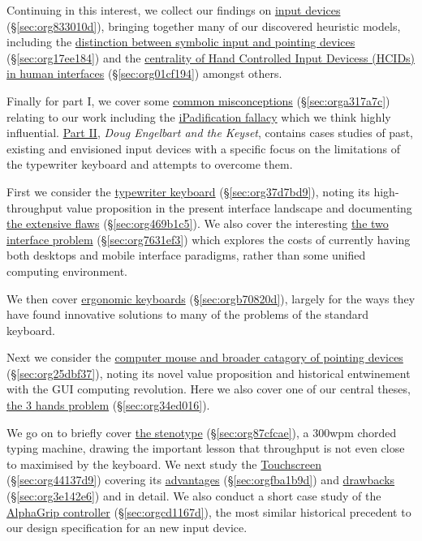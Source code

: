 \documentclass[logo,bsc,singlespacing,parskip]{infthesis}
\begin{document}
Continuing in this interest, we collect our findings on \hyperref[sec:org833010d]{input devices} (\S \ref{sec:org833010d}), bringing together many of our discovered heuristic models, including the \hyperref[sec:org17ee184]{distinction between symbolic input and pointing devices} (\S \ref{sec:org17ee184}) and the \hyperref[sec:org01cf194]{centrality of Hand Controlled Input Devicess (HCIDs) in human interfaces} (\S \ref{sec:org01cf194}) amongst others.

Finally for part I, we cover some \hyperref[sec:orga317a7c]{common misconceptions} (\S \ref{sec:orga317a7c}) relating to our work including the \hyperref[ipadification fallacy]{iPadification fallacy} which we think highly influential.
\hyperref[sec:org8d4b58d]{Part II}, \emph{Doug Engelbart and the Keyset}, contains cases studies of past, existing and envisioned input devices with a specific focus on the limitations of the typewriter keyboard and attempts to overcome them.

First we consider the \hyperref[sec:org37d7bd9]{typewriter keyboard} (\S \ref{sec:org37d7bd9}), noting its high-throughput value proposition in the present interface landscape and documenting \hyperref[sec:org469b1c5]{the extensive flaws} (\S \ref{sec:org469b1c5}).
We also cover the interesting \hyperref[sec:org7631ef3]{the two interface problem} (\S \ref{sec:org7631ef3}) which explores the costs of currently having both desktops and mobile interface paradigms, rather than some unified computing environment.

We then cover \hyperref[sec:orgb70820d]{ergonomic keyboards} (\S \ref{sec:orgb70820d}), largely for the ways they have found innovative solutions to many of the problems of the standard keyboard.

Next we consider the \hyperref[sec:org25dbf37]{computer mouse and broader catagory of pointing devices} (\S \ref{sec:org25dbf37}), noting its novel value proposition and historical entwinement with the GUI computing revolution.
Here we also cover one of our central theses, \hyperref[sec:org34ed016]{the 3 hands problem} (\S \ref{sec:org34ed016}).

We go on to briefly cover \hyperref[sec:org87cfcae]{the stenotype} (\S \ref{sec:org87cfcae}), a 300wpm chorded typing machine, drawing the important lesson that throughput is not even close to maximised by the keyboard.
We next study the \hyperref[sec:org44137d9]{Touchscreen} (\S \ref{sec:org44137d9}) covering its \hyperref[sec:orgfba1b9d]{advantages} (\S \ref{sec:orgfba1b9d}) and \hyperref[sec:org3e142e6]{drawbacks} (\S \ref{sec:org3e142e6}) and in detail.
We also conduct a short case study of the \hyperref[sec:orgcd1167d]{AlphaGrip controller} (\S \ref{sec:orgcd1167d}), the most similar historical precedent to our design specification for an new input device.
\end{document}
